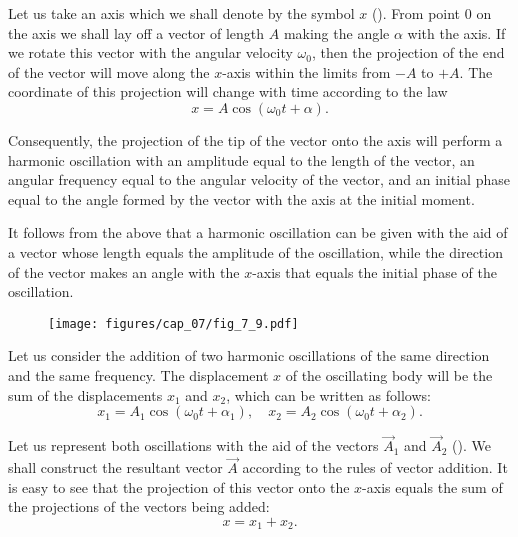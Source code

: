 Let us take an axis which we shall denote by the symbol $x$ (). From point $0$ on the axis we shall lay off a vector of length $A$ making the angle $\alpha$ with the axis. If we rotate this vector with the angular velocity $\omega_0$, then the projection of the end of the vector will move along the $x$-axis within the limits from $-A$ to $+A$. The coordinate of this projection will change with time according to the law
\begin{equation*}
	x = A\cos(\omega_0 t + \alpha).
\end{equation*}

\noindent
Consequently, the projection of the tip of the vector onto the axis will perform a harmonic oscillation with an amplitude equal to the length of the vector, an angular frequency equal to the angular velocity of the vector, and an initial phase equal to the angle formed by the vector with the axis at the initial moment.

It follows from the above that a harmonic oscillation can be given with the aid of a vector whose length equals the amplitude of the oscillation, while the direction of the vector makes an angle with the $x$-axis that equals the initial phase of the oscillation.

\begin{figure}[t]
	\begin{center}
		\texttt{[image: figures/cap\_07/fig\_7\_9.pdf]}
		\caption[]{}
		\label{fig:7_9}
	\end{center}
	\vspace{-0.8cm}
\end{figure}

Let us consider the addition of two harmonic oscillations of the same direction and the same frequency. The displacement $x$ of the oscillating body will be the sum of the displacements $x_1$ and $x_2$, which can be written as follows:
\begin{equation}\label{eq:7_83}
	x_1 = A_1\cos(\omega_0 t + \alpha_1),\quad x_2 = A_2\cos(\omega_0 t + \alpha_2).
\end{equation}

\noindent
Let us represent both oscillations with the aid of the vectors $\vec{A}_1$ and $\vec{A}_2$ (). We shall construct the resultant vector $\vec{A}$ according to the rules of vector addition. It is easy to see that the projection of this vector onto the $x$-axis equals the sum of the projections of the vectors being added:
\begin{equation*}
	x = x_1 + x_2.
\end{equation*}

